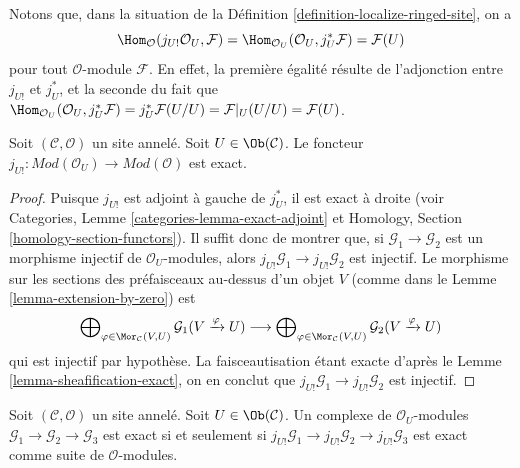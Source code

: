 \noindent
Notons que, dans la situation de la
Définition \ref{definition-localize-ringed-site}, on a
\begin{equation}
\label{equation-map-lower-shriek-OU-into-module}
\Hom_\mathcal{O}(j_{U!}\mathcal{O}_U, \mathcal{F}) =
\Hom_{\mathcal{O}_U}(\mathcal{O}_U, j_U^*\mathcal{F}) =
\mathcal{F}(U)
\end{equation}
pour tout $\mathcal{O}$-module $\mathcal{F}$. En effet, la première égalité
résulte de l'adjonction entre $j_{U!}$ et $j_U^*$, et la seconde du fait que
$\Hom_{\mathcal{O}_U}(\mathcal{O}_U, j_U^*\mathcal{F}) =
j_U^*\mathcal{F}(U/U) = \mathcal{F}|_U(U/U) = \mathcal{F}(U)$.

\begin{lemma}
\label{lemma-extension-by-zero-exact}
Soit $(\mathcal{C}, \mathcal{O})$ un site annelé.
Soit $U \in \Ob(\mathcal{C})$.
Le foncteur
$j_{U!} : \textit{Mod}(\mathcal{O}_U) \to \textit{Mod}(\mathcal{O})$
est exact.
\end{lemma}

\begin{proof}
Puisque $j_{U!}$ est adjoint à gauche de $j_U^*$, il est exact à droite
(voir
Categories, Lemme \ref{categories-lemma-exact-adjoint}
et
Homology, Section \ref{homology-section-functors}).
Il suffit donc de montrer que, si $\mathcal{G}_1 \to \mathcal{G}_2$
est un morphisme injectif de $\mathcal{O}_U$-modules, alors
$j_{U!}\mathcal{G}_1 \to j_{U!}\mathcal{G}_2$ est injectif.
Le morphisme sur les sections des préfaisceaux au-dessus d'un objet $V$
(comme dans le Lemme \ref{lemma-extension-by-zero}) est
$$
\bigoplus\nolimits_{\varphi \in \Mor_\mathcal{C}(V, U)}
\mathcal{G}_1(V \xrightarrow{\varphi} U)
\longrightarrow
\bigoplus\nolimits_{\varphi \in \Mor_\mathcal{C}(V, U)}
\mathcal{G}_2(V \xrightarrow{\varphi} U)
$$
qui est injectif par hypothèse. La faisceautisation étant exacte d'après le
Lemme \ref{lemma-sheafification-exact},
on en conclut que $j_{U!}\mathcal{G}_1 \to j_{U!}\mathcal{G}_2$ est injectif.
\end{proof}

\begin{lemma}
\label{lemma-j-shriek-reflects-exactness}
Soit $(\mathcal{C}, \mathcal{O})$ un site annelé.
Soit $U \in \Ob(\mathcal{C})$. Un complexe de $\mathcal{O}_U$-modules
$\mathcal{G}_1 \to \mathcal{G}_2 \to \mathcal{G}_3$ est exact
si et seulement si
$j_{U!}\mathcal{G}_1 \to j_{U!}\mathcal{G}_2 \to j_{U!}\mathcal{G}_3$
est exact comme suite de $\mathcal{O}$-modules.
\end{lemma}


